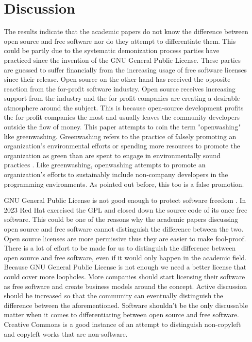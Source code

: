 \documentclass[conference]{IEEEtran}
\begin{document}
\section{Discussion}
The results indicate that the academic papers do not know the difference between open source and free software nor do they attempt to differentiate them. This could be partly due to the systematic demonization process parties have practiced since the invention of the GNU General Public License. These parties are guessed to suffer financially from the increasing usage of free software licenses since their release. Open source on the other hand has received the opposite reaction from the for-profit software industry. Open source receives increasing support from the industry and the for-profit companies are creating a desirable atmosphere around the subject. This is because open-source development profits the for-profit companies the most and usually leaves the community developers outside the flow of money. This paper attempts to coin the term "openwashing" like greenwashing. Greenwashing refers to the practice of falsely promoting an organization's environmental efforts or spending more resources to promote the organization as green than are spent to engage in environmentally sound practices \cite{greenwashing}. Like greenwashing, openwashing attempts to promote an organization's efforts to sustainably include non-company developers in the programming environments. As pointed out before, this too is a false promotion.

GNU General Public License is not good enough to protect software freedom \cite{rhelanalysis} \cite{gpldebug}. In 2023 Red Hat exercised the GPL and closed down the source code of its once free software. This could be one of the reasons why the academic papers discussing open source and free software cannot distinguish the difference between the two. Open source licenses are more permissive thus they are easier to make fool-proof.
There is a lot of effort to be made for us to distinguish the difference between open source and free software, even if it would only happen in the academic field. Because GNU General Public License is not enough we need a better license that could cover more loopholes. More companies should start licensing their software as free software and create business models around the concept. Active discussion should be increased so that the community can eventually distinguish the difference between the aforementioned. Software shouldn't be the only discussable matter when it comes to differentiating between open source and free software. Creative Commons is a good instance of an attempt to distinguish non-copyleft and copyleft works that are non-software.
\end{document}
